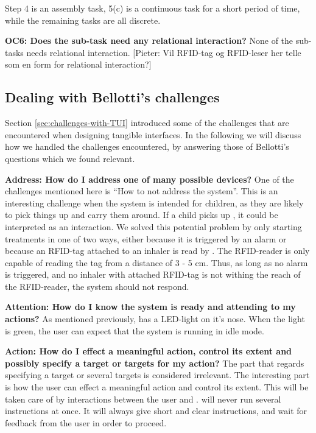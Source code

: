 Step 4 is an assembly task, 5(c) is a continuous task for a short period of time, while the remaining tasks are all discrete.  

\textbf{OC6: Does the sub-task need any relational interaction?}
None of the sub-tasks needs relational interaction.
[Pieter: Vil RFID-tag og RFID-leser her telle som en form for relational interaction?]
 
\subsection{Dealing with Bellotti's challenges}

Section \ref{sec:challenges-with-TUI} introduced some of the challenges that are encountered when designing tangible interfaces. In the following we will discuss how we handled the challenges encountered, by answering those of Bellotti's questions which we found relevant. 

\textbf{Address: How do I address one of many possible devices?}
One of the challenges mentioned here is ``How to not address the system''. This is an interesting challenge when the system is intended for children, as they are likely to pick things up and carry them around. If a child picks up \ab{}, it could be interpreted as an interaction. We solved this potential problem by only starting treatments in one of two ways, either because it is triggered by an alarm or because an RFID-tag attached to an inhaler is read by \ab{}. The RFID-reader is only capable of reading the tag from a distance of 3 - 5 cm. Thus, as long as no alarm is triggered, and no inhaler with attached RFID-tag is not withing the reach of the RFID-reader, the system should not respond.  


\textbf{Attention: How do I know the system is ready and attending to my actions?}
As mentioned previously, \buddy{} has a LED-light on it's nose. When the light is green, the user can expect that the system is running in idle mode. 

\textbf{Action: How do I effect a meaningful action, control its extent and possibly specify a target or targets for my action?}
The part that regards specifying a target or several targets is considered irrelevant. The interesting part is how the user can effect a meaningful action and control its extent. This will be taken care of by interactions between the user and \buddy{}. \buddy{} will never run several instructions at once. It will always give short and clear instructions, and wait for feedback from the user in order to proceed. 

